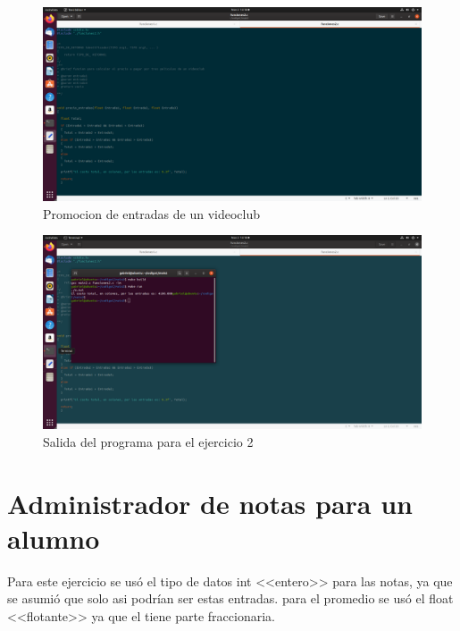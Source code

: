 \documentclass[
  letterpaper, 
  maincolor=black,
  sectioncolor=black!90,
  subsectioncolor=black!70,
  itemtextcolor=black!40,
]{fortysecondscv}
\begin{document}
            \begin{figure}[H]
                \centering
                \includegraphics[trim= 50 50 850 100,clip,width=1.20\textwidth]{img/punto2.png}
                \caption{Promocion de entradas de un videoclub}
                \label{fig:my_label}
            \end{figure}
            \begin{figure}[H]
                \centering
                \includegraphics[trim= 140 500 900 150,clip,width=1.20\textwidth]{img/punto2-2.png}
                \caption{Salida del programa para el ejercicio 2}
                \label{fig:my_label}
            \end{figure}
            
    \section{Administrador de notas para un alumno}
        Para este ejercicio se usó el tipo de datos int <<entero>> para las notas, ya que se asumió que solo asi podrían ser estas entradas. para el promedio se usó el float <<flotante>> ya que el tiene parte fraccionaria.
        
\end{document}
